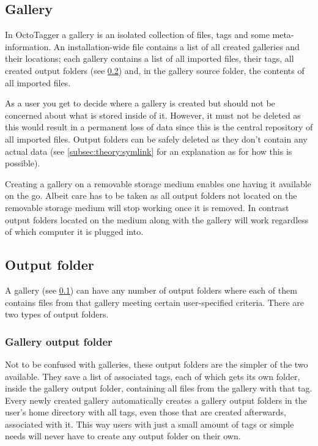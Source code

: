 \subsection{Gallery}%
\label{subsec:theory:gallery}

In OctoTagger a gallery is an isolated collection of files, tags and some
meta-information. An installation-wide file contains a list of all created
galleries and their locations; each gallery contains a list of all imported
files, their tags, all created output folders (see
\cref{subsec:theory:output_folder}) and, in the gallery source folder, the
contents of all imported files.

As a user you get to decide where a gallery is created but should not be
concerned about what is stored inside of it. However, it must not be deleted as
this would result in a permanent loss of data since this is the central
repository of all imported files. Output folders can be safely deleted as they
don't contain any actual data (see \cref{subsec:theory:symlink} for an
explanation as for how this is possible).

Creating a gallery on a removable storage medium enables one having it available
on the go. Albeit care has to be taken as all output folders not located on the
removable storage medium will stop working once it is removed. In contrast
output folders located on the medium along with the gallery will work
regardless of which computer it is plugged into.

\subsection{Output folder}%
\label{subsec:theory:output_folder}

A gallery (see \cref{subsec:theory:gallery}) can have any number of output
folders where each of them contains files from that gallery meeting certain
user-specified criteria. There are two types of output folders.

\subsubsection{Gallery output folder}

Not to be confused with galleries, these output folders are the simpler of the
two available. They save a list of associated tags, each of which gets its own
folder, inside the gallery output folder, containing all files from the gallery
with that tag. Every newly created gallery automatically creates a gallery
output folders in the user's home directory with all tags, even those that are
created afterwards, associated with it. This way users with just a small amount
of tags or simple needs will never have to create any output folder on their
own.

